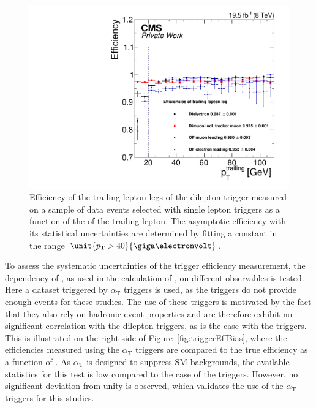 \begin{figure}
\begin{center}
\includegraphics[scale=0.45]{plots/BG/trigger/Triggereff_SingleLepton_HighHTExclusive_Full2012_TrailingPt_leadingPt30Single.pdf}
\caption{Efficiency of the trailing lepton legs of the dilepton trigger measured on a sample of data events selected with single lepton triggers as a function of the \pt of the trailing lepton. The asymptotic efficiency with its statistical uncertainties are determined by fitting a constant in the range $\unit{\pt > 40}{\giga\electronvolt}$.}
\label{fig:triggerEffTrailing}
\end{center}
\end{figure} 

To assess the systematic uncertainties of the trigger efficiency measurement, the dependency of \RT, as used in the calculation of \Rsfof, on different observables is tested. Here a dataset triggered by $\alpha_\mathrm{T}$ triggers is used, as the \HT triggers do not provide enough events for these studies. The use of these triggers is motivated by the fact that they also rely on hadronic event properties and are therefore exhibit no significant correlation with the dilepton triggers, as is the case with the \HT triggers. This is illustrated on the right side of Figure~\ref{fig:triggerEffBias}, where the efficiencies measured using the $\alpha_{\mathrm{T}}$ triggers are compared to the true efficiency as a function of \mll. As $\alpha_{\mathrm{T}}$ is designed to suppress SM backgrounds, the available statistics for this test is low compared to the case of the \HT triggers. However, no significant deviation from unity is observed, which validates the use of the $\alpha_{\mathrm{T}}$ triggers for this studies.

